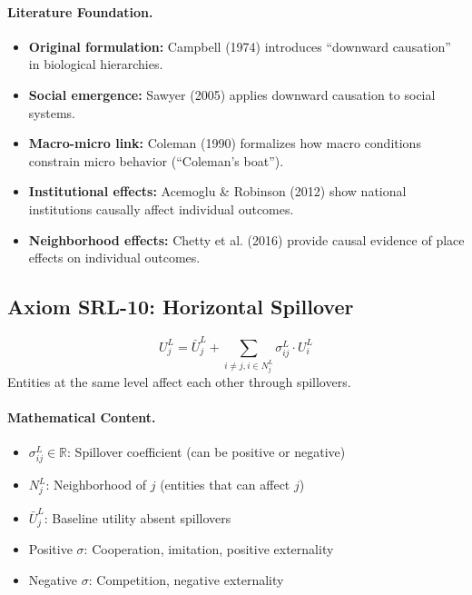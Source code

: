 \paragraph{Literature Foundation.}
\begin{itemize}
\item \textbf{Original formulation:} Campbell (1974) introduces ``downward causation'' 
in biological hierarchies.
\item \textbf{Social emergence:} Sawyer (2005) applies downward causation to 
social systems.
\item \textbf{Macro-micro link:} Coleman (1990) formalizes how macro conditions 
constrain micro behavior (``Coleman's boat'').
\item \textbf{Institutional effects:} Acemoglu \& Robinson (2012) show national 
institutions causally affect individual outcomes.
\item \textbf{Neighborhood effects:} Chetty et al. (2016) provide causal evidence 
of place effects on individual outcomes.
\end{itemize}

\subsection{Axiom SRL-10: Horizontal Spillover}

\begin{tcolorbox}[colback=gray!5!white, colframe=gray!75!black, title=Axiom SRL-10: Horizontal Spillover]
\begin{equation}
\boxed{
U^L_j = \bar{U}^L_j + \sum_{i \neq j, i \in N^L_j} \sigma^L_{ij} \cdot U^L_i
}
\end{equation}
Entities at the same level affect each other through spillovers.
\end{tcolorbox}

\paragraph{Mathematical Content.}
\begin{itemize}
\item $\sigma^L_{ij} \in \mathbb{R}$: Spillover coefficient (can be positive or negative)
\item $N^L_j$: Neighborhood of $j$ (entities that can affect $j$)
\item $\bar{U}^L_j$: Baseline utility absent spillovers
\item Positive $\sigma$: Cooperation, imitation, positive externality
\item Negative $\sigma$: Competition, negative externality
\end{itemize}


